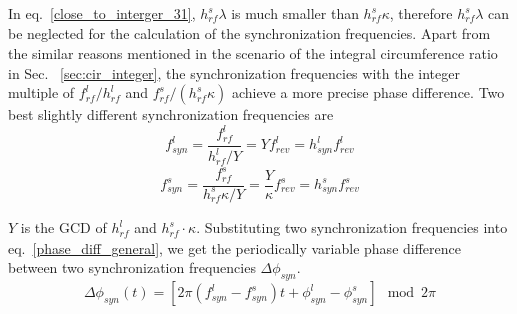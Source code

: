 In eq.~\ref{close_to_interger_31}, $h^s_\mathit{rf}\lambda $ is much smaller than $h^s_\mathit{rf}\kappa$, therefore $h^s_\mathit{rf}\lambda $ can be neglected for the calculation of the synchronization frequencies. Apart from the similar reasons mentioned in the scenario of the integral circumference ratio in Sec. ~\ref{sec:cir_integer}, the synchronization frequencies with the integer multiple of $f_{\mathit{rf}}^{l}/h^l_\mathit{rf} $ and $f_{\mathit{rf}}^{s}/(h^s_\mathit{rf}\kappa)$ achieve a more precise phase difference. Two best slightly different synchronization frequencies are 
\begin{equation}
f_{\mathit{syn}}^{l}=\frac{f_{\mathit{rf}}^{l}}{h^l_\mathit{rf}/Y}=Yf_{\mathit{rev}}^{l}=h_\mathit{syn}^\mathit{l}f_{\mathit{rev}}^{l} \label{synch_freq11}
\end{equation}
\begin{equation}
f_{\mathit{syn}}^{s}=\frac{f_{\mathit{rf}}^{s}}{h^s_\mathit{rf}\kappa/Y}=\frac{Y}{\kappa}f_{\mathit{rev}}^{s}=h_\mathit{syn}^\mathit{s}f_{\mathit{rev}}^{s} \label{synch_freq22}
\end{equation}


$Y$ is the GCD of $h^l_\mathit{rf}$ and $h^s_\mathit{rf} \cdot \kappa$. Substituting two synchronization frequencies into eq.~\ref{phase_diff_general}, we get the periodically variable phase difference between two synchronization frequencies $\Delta \phi_\mathit{syn}$.
\begin{equation}
	\Delta \phi_\mathit{syn}(t)=[2\pi(f_{\mathit{syn}}^{l}-f_{\mathit{syn}}^{s})t+\phi_\mathit{syn}^l-\phi^s_\mathit{syn}] \mod 2\pi \label{phase_diff_general1}
\end{equation}

